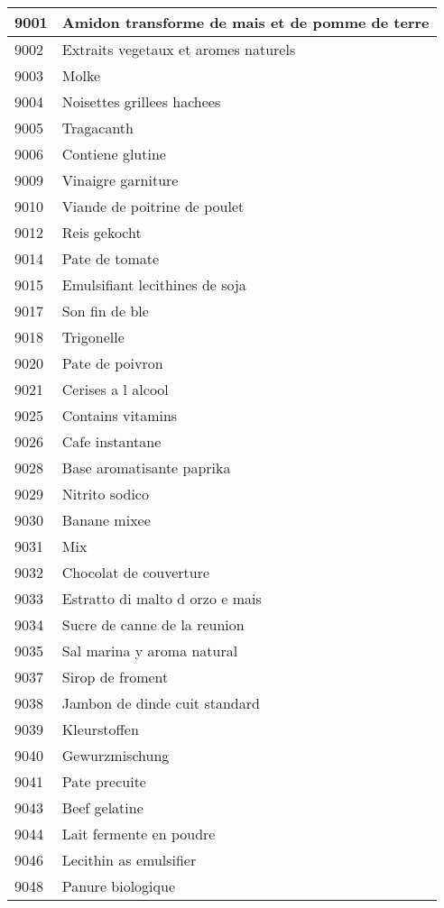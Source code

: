 \begin{longtable}{|l|l|}
9001 & Amidon transforme de mais et de pomme de terre \\ \hline 
9002 & Extraits vegetaux et aromes naturels \\ \hline 
9003 & Molke \\ \hline 
9004 & Noisettes grillees hachees \\ \hline 
9005 & Tragacanth \\ \hline 
9006 & Contiene glutine \\ \hline 
9009 & Vinaigre garniture \\ \hline 
9010 & Viande de poitrine de poulet \\ \hline 
9012 & Reis gekocht \\ \hline 
9014 & Pate de tomate \\ \hline 
9015 & Emulsifiant lecithines de soja \\ \hline 
9017 & Son fin de ble \\ \hline 
9018 & Trigonelle \\ \hline 
9020 & Pate de poivron \\ \hline 
9021 & Cerises a l alcool \\ \hline 
9025 & Contains vitamins \\ \hline 
9026 & Cafe instantane \\ \hline 
9028 & Base aromatisante paprika \\ \hline 
9029 & Nitrito sodico \\ \hline 
9030 & Banane mixee \\ \hline 
9031 & Mix \\ \hline 
9032 & Chocolat de couverture \\ \hline 
9033 & Estratto di malto d orzo e mais \\ \hline 
9034 & Sucre de canne de la reunion \\ \hline 
9035 & Sal marina y aroma natural \\ \hline 
9037 & Sirop de froment \\ \hline 
9038 & Jambon de dinde cuit standard \\ \hline 
9039 & Kleurstoffen \\ \hline 
9040 & Gewurzmischung \\ \hline 
9041 & Pate precuite \\ \hline 
9043 & Beef gelatine \\ \hline 
9044 & Lait fermente en poudre \\ \hline 
9046 & Lecithin as emulsifier \\ \hline 
9048 & Panure biologique \\ \hline 

\end{longtable}
